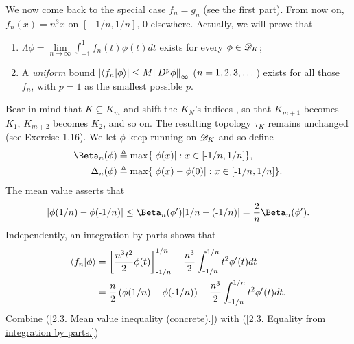 We now come back to the special case $f_n = g_n$ (see the first part). %
From now on, $f_n(x) = n^3 x$ on $[\minus 1/n, 1/n]$, $0$ elsewhere. %
Actually, we will prove that 
%
  \renewcommand{\labelenumi}{(\alph{enumi})}
  \begin{enumerate}
    \item{
        $\Lambda\phi 
          = 
        \underset{n \to \infty}{\lim} \int_{\minus 1}^1 f_{n}(t)\phi(t)dt$ 
      exists for every $\phi\in{\mathscr D}_{K}$;
    }
    \item{
      A \textit{uniform} bound %
        $\lvert\bra{f_n}\ket{\phi}\rvert \leq M \norm{D^p \phi}_{\infty}$ %
        ($n=1, 2, 3, \dots$) %
      exists for all those $f_n$, with $p=1$ as the smallest possible $p$.
    }
  \end{enumerate}
  \renewcommand{\labelenumi}{(\roman{enumi})}
%
%
Bear in mind that %
%
  $K \subseteq K_m$ %
%
and shift the $K_N$'s indices%
, so that %
%
  $K_{m+1}$ becomes $K_1$, $K_{m+2}$ becomes $K_2$, and so on. %
%
The resulting topology $\tau_K$ remains unchanged (see Exercise 1.16). %
%
We let $\phi$ keep running on ${\mathscr D}_K$ and so define %
%
  \begin{align}
    \Beta_{n}(\phi) 
      & 
        \Def  \max\set{\magnitude{\phi(x)}}{x \in [\minus 1/n, 1/n]}, \\
    \Delta_{n}(\phi) 
      & 
        \Def  \max\set{\magnitude{\phi(x) - \phi(0)}}{x \in [\minus 1/n, 1/n]}. 
  \end{align}
%
The mean value asserts that 
%
  \begin{align}\label{2.3. Mean value inequality (concrete).}
    \magnitude{ \phi(1/n) - \phi(\minus 1/n)} 
      \leq 
    \Beta_{n}(\phi')\magnitude{1/n - ({\minus}1/n)} 
      = 
    \frac{2}{n} \Beta_{n}(\phi').
  \end{align}
%
Independently, an integration by parts shows that %
%
  \begin{align}
    \bra{f_n}\ket{\phi}
      & =  
        \left[ \frac{n^3 t^2}{2} \phi(t) \right]^{1/n}_{\text{\small{-}} 1/n}
        - \frac{n^3}{2} \int_{\text{\small{-}} 1/n}^{1/n} t^{2} \phi'(t)dt\\ 
      \label{2.3. Equality from integration by parts.}
      & =  
        \frac{n}{2}\left(\phi(1/n) - \phi(\text{\small{-}} 1/n)\right)
        - \frac{n^3}{2} \int_{\text{\small{-}} 1/n}^{1/n} t^{2} \phi'(t)dt.
  \end{align}
Combine %
%
  (\ref{2.3. Mean value inequality (concrete).}) %
%
with %
  (\ref{2.3. Equality from integration by parts.})
